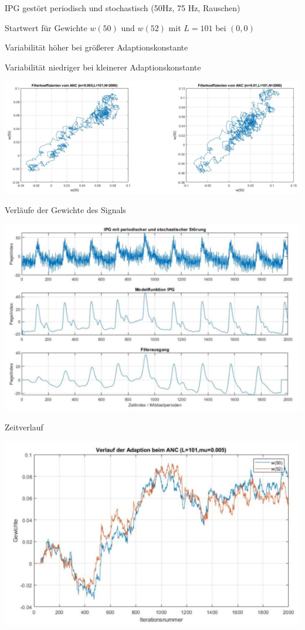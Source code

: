 \documentclass[a4paper]{article}
\begin{document}
\begin{multicols}{3}
  \begin{itemize*}
    \item IPG gestört periodisch und stochastisch (50Hz, 75 Hz, Rauschen)
    \item Startwert für Gewichte $w(50)$ und $w(52)$ mit $L=101$ bei $(0,0)$
    \item Variabilität höher bei größerer Adaptionskonstante
    \item Variabilität niedriger bei kleinerer Adaptionskonstante
    \item \includegraphics[width=.5\linewidth]{Assets/Biosignalverarbeitung-adaptiver-filter-adaption-anc.png}
    \item Verläufe der Gewichte des Signals
    \begin{itemize*}
      \item \includegraphics[width=.5\linewidth]{Assets/Biosignalverarbeitung-adaptiver-filter-reale-aufnahme.png}
    \end{itemize*}
    \item Zeitverlauf
    \begin{itemize*}
      \item \includegraphics[width=.5\linewidth]{Assets/Biosignalverarbeitung-adaptiver-filter-zeitverlauf-anc.png}
    \end{itemize*}
  \end{itemize*}


\end{multicols}
\end{document}
